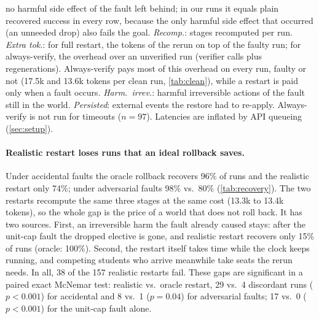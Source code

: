 \documentclass[11pt]{article}
\begin{document}
\begin{table}[h]
{no harmful side effect of the fault left behind; in our runs it equals plain
recovered success in every row, because the only harmful side effect that
occurred (an unneeded drop) also fails the goal. \emph{Recomp.}: stages
recomputed per run. \emph{Extra tok.}: for full restart, the tokens of the
rerun on top of the faulty run; for always-verify, the overhead over an
unverified run (verifier calls plus regenerations). Always-verify pays most of
this overhead on every run, faulty or not (17.5k and 13.6k tokens per clean
run, \cref{tab:clean}), while a restart is paid only when a fault occurs.
\emph{Harm.\ irrev.}: harmful irreversible actions of the fault still in the
world. \emph{Persisted}: external events the restore had to re-apply.
Always-verify is not run for timeouts ($n=97$). Latencies are inflated by API
queueing (\cref{sec:setup}).}
\label{tab:recovery}
\end{table}

\paragraph{Realistic restart loses runs that an ideal rollback saves.} Under
accidental faults the oracle rollback recovers 96\% of runs and the realistic
restart only 74\%; under adversarial faults 98\% vs.\ 80\%
(\cref{tab:recovery}). The two restarts recompute the same three stages at the
same cost (13.3k to 13.4k tokens), so the whole gap is the price of a world
that does not roll back. It has two sources. First, an irreversible harm the
fault already caused stays: after the unit-cap fault the dropped elective is
gone, and realistic restart recovers only 15\% of runs (oracle: 100\%).
Second, the restart itself takes time while the clock keeps running, and
competing students who arrive meanwhile take seats the rerun needs. In all,
38 of the 157 realistic restarts fail. These gaps are significant in a paired
exact McNemar test: realistic vs.\ oracle restart, 29 vs.\ 4 discordant runs
($p<0.001$) for accidental and 8 vs.\ 1 ($p=0.04$) for adversarial faults;
17 vs.\ 0 ($p<0.001$) for the unit-cap fault alone.
\end{document}
